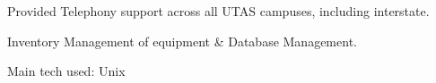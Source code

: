 \documentclass[a4paper]{deedy-resume} %
\begin{document}
\begin{minipage}[t]{0.66\textwidth}
\sectionspace %



\begin{tightitemize}
\item Provided Telephony support across all UTAS campuses, including interstate.
\item Inventory Management of equipment \& Database Management.
\end{tightitemize}
Main tech used: \textbullet{} Unix

\sectionspace %







\end{minipage}
\end{document}
